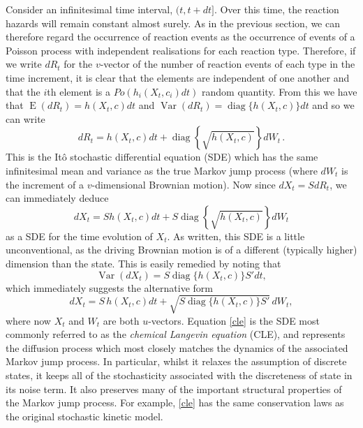 \documentclass[12pt, DIV12]{scrartcl}
\begin{document}
Consider an infinitesimal time interval, $(t,t+{d}t]$. Over this time, the
reaction hazards will remain constant almost surely. As in the previous section,
we can therefore regard the occurrence of reaction events as the occurrence of
events of a Poisson process with independent realisations for each reaction
type. Therefore, if we write $dR_t$ for the $v$-vector of the number of reaction
events of each type in the time increment, it is clear that the elements are
independent of one another and that the $i$th element is a $Po(h_i(X_t,c_i)dt)$
random quantity. From this we have that $\operatorname{E}({d}R_t)=h(X_t,c){d}t$
and $\operatorname{Var}({d}R_t)=\operatorname{diag}\{h(X_t,c)\}{d}t$ and so we
can write
\[
{d}R_t = h(X_t,c){d}t + \operatorname{diag}\left\{\sqrt{h(X_t,c)}\right\}{d}W_t \,.
\]
This is the It\^o stochastic differential equation (SDE) which has the same
infinitesimal mean and variance as the true Markov jump process (where
${d}W_t$ is the increment of a $v$-dimensional Brownian motion). Now
since ${d}X_t=S{d}R_t$, we can immediately deduce
\begin{equation}\label{cle0}
{d}X_t = Sh(X_t,c){d}t + S\operatorname{diag}\left\{\sqrt{h(X_t,c)}\right\}{d}W_t
\end{equation}
as a SDE for the time evolution of $X_t$. As written, this SDE is a little
unconventional, as the driving Brownian motion is of a different (typically
higher) dimension than the state. This is easily remedied by noting that
\[
\operatorname{Var}({d}X_t) = S\operatorname{diag}\{h(X_t,c)\}S'{d}t,
\]
which immediately suggests the alternative form
\begin{equation}
{d}X_t = S\,h(X_t,c){d}t + \sqrt{S\operatorname{diag}\{h(X_t,c)\}S'}\,{d}W_t,
\label{cle}
\end{equation}
where now $X_t$ and $W_t$ are both $u$-vectors. Equation \eqref{cle} is the SDE
most commonly referred to as the \emph{chemical Langevin equation} (CLE), and
represents the diffusion process which most closely matches the dynamics of the
associated Markov jump process. In particular, whilst it relaxes the assumption
of discrete states, it keeps all of the stochasticity associated with the
discreteness of state in its noise term. It also preserves many of the important
structural properties of the Markov jump process. For example, \eqref{cle} has
the same conservation laws as the original stochastic kinetic model.
\end{document}
